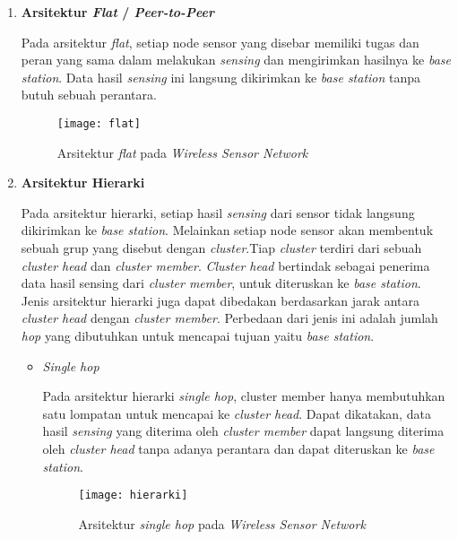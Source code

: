 \begin{enumerate}[label=(\roman*)]
	\item \textbf{Arsitektur \textit{Flat} / \textit{Peer-to-Peer}}
	
	Pada arsitektur \textit{flat}, setiap node sensor yang disebar memiliki tugas dan peran yang sama dalam melakukan \textit{sensing} dan mengirimkan hasilnya ke \textit{base station}. Data hasil \textit{sensing} ini langsung dikirimkan ke \textit{base station} tanpa butuh sebuah perantara.
	
	\begin{figure}[H] 
		\centering  
		\texttt{[image: flat]}  
		\caption[Arsitektur \textit{flat} pada \textit{Wireless Sensor Network}]				{Arsitektur \textit{flat} pada \textit{Wireless Sensor Network}}
		\label{fig:flat} 
	\end{figure}
	
	\item \textbf{Arsitektur Hierarki}
	
	Pada arsitektur hierarki, setiap hasil \textit{sensing} dari sensor tidak langsung dikirimkan ke \textit{base station}. Melainkan setiap node sensor akan membentuk sebuah grup yang disebut dengan \textit{cluster}.Tiap \textit{cluster} terdiri dari sebuah \textit{cluster head} dan \textit{cluster member}. \textit{Cluster head} bertindak sebagai penerima data hasil sensing dari \textit{cluster member}, untuk diteruskan ke \textit{base station}. Jenis arsitektur hierarki juga dapat dibedakan berdasarkan jarak antara \textit{cluster head} dengan \textit{cluster member}. Perbedaan dari jenis ini adalah jumlah \textit{hop} yang dibutuhkan untuk mencapai tujuan yaitu \textit{base station}.
	
	\begin{itemize}
		\item \textit{Single hop}
		
		Pada arsitektur hierarki \textit{single hop}, cluster member hanya membutuhkan satu lompatan untuk mencapai ke \textit{cluster head}. Dapat dikatakan, data hasil \textit{sensing} yang diterima oleh \textit{cluster member} dapat langsung diterima oleh \textit{cluster head} tanpa adanya perantara dan dapat diteruskan ke \textit{base station}. 
		
		\begin{figure}[H] 
		\centering  
		\texttt{[image: hierarki]}  
		\caption[Arsitektur \textit{single hop} pada \textit{Wireless Sensor Network}]{Arsitektur \textit{single hop} pada \textit{Wireless Sensor Network}}
		\label{fig:hierarki} 
	\end{figure}
		

\end{itemize}
\end{enumerate}
